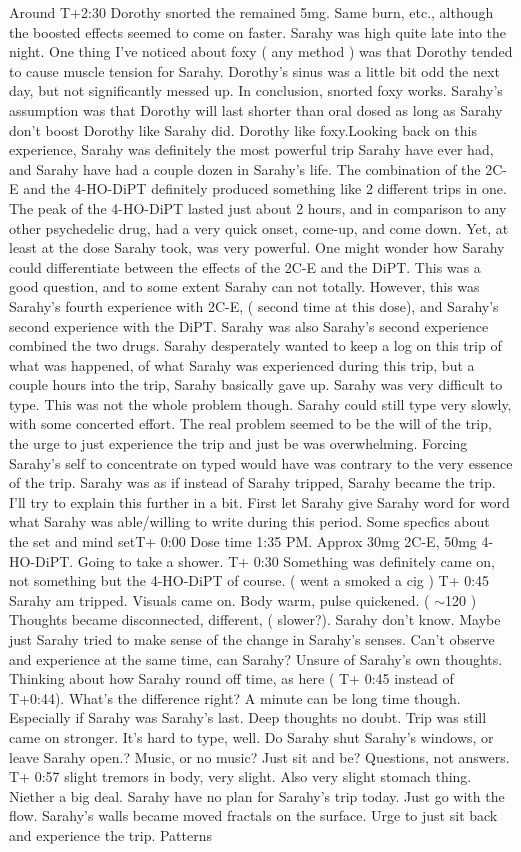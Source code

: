\documentclass[12pt]{book}
\begin{document}
Around T+2:30 Dorothy snorted the remained 5mg. Same burn, etc., although the boosted effects seemed to come on faster. Sarahy was high quite late into the night. One thing I've noticed about foxy ( any method ) was that Dorothy tended to cause muscle tension for Sarahy. Dorothy's sinus was a little bit odd the next day, but not significantly messed up. In conclusion, snorted foxy works. Sarahy's assumption was that Dorothy will last shorter than oral dosed as long as Sarahy don't boost Dorothy like Sarahy did. Dorothy like foxy.Looking back on this experience, Sarahy was definitely the most powerful trip Sarahy have ever had, and Sarahy have had a couple dozen in Sarahy's life. The combination of the 2C-E and the 4-HO-DiPT definitely produced something like 2 different trips in one. The peak of the 4-HO-DiPT lasted just about 2 hours, and in comparison to any other psychedelic drug, had a very quick onset, come-up, and come down. Yet, at least at the dose Sarahy took, was very powerful. One might wonder how Sarahy could differentiate between the effects of the 2C-E and the DiPT. This was a good question, and to some extent Sarahy can not totally. However, this was Sarahy's fourth experience with 2C-E, ( second time at this dose), and Sarahy's second experience with the DiPT. Sarahy was also Sarahy's second experience combined the two drugs. Sarahy desperately wanted to keep a log on this trip of what was happened, of what Sarahy was experienced during this trip, but a couple hours into the trip, Sarahy basically gave up. Sarahy was very difficult to type. This was not the whole problem though. Sarahy could still type very slowly, with some concerted effort. The real problem seemed to be the will of the trip, the urge to just experience the trip and just be was overwhelming. Forcing Sarahy's self to concentrate on typed would have was contrary to the very essence of the trip. Sarahy was as if instead of Sarahy tripped, Sarahy became the trip. I'll try to explain this further in a bit. First let Sarahy give Sarahy word for word what Sarahy was able/willing to write during this period. Some specfics about the set and mind setT+ 0:00 Dose time 1:35 PM. Approx 30mg 2C-E, 50mg 4-HO-DiPT. Going to take a shower. T+ 0:30 Something was definitely came on, not something but the 4-HO-DiPT of course. ( went a smoked a cig ) T+ 0:45 Sarahy am tripped. Visuals came on. Body warm, pulse quickened. ( $\sim$120 ) Thoughts became disconnected, different, ( slower?). Sarahy don't know. Maybe just Sarahy tried to make sense of the change in Sarahy's senses. Can't observe and experience at the same time, can Sarahy? Unsure of Sarahy's own thoughts. Thinking about how Sarahy round off time, as here ( T+ 0:45 instead of T+0:44). What's the difference right? A minute can be long time though. Especially if Sarahy was Sarahy's last. Deep thoughts no doubt. Trip was still came on stronger. It's hard to type, well. Do Sarahy shut Sarahy's windows, or leave Sarahy open.? Music, or no music? Just sit and be? Questions, not answers. T+ 0:57 slight tremors in body, very slight. Also very slight stomach thing. Niether a big deal. Sarahy have no plan for Sarahy's trip today. Just go with the flow. Sarahy's walls became moved fractals on the surface. Urge to just sit back and experience the trip. Patterns 
\end{document}
